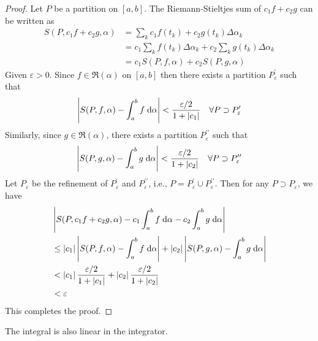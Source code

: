 \documentclass[thmcnt=section, 12pt]{my-elegantbook}
\begin{document}
\begin{proof}
    Let $P$ be a partition on $[a,b]$. The Riemann-Stieltjes sum of $c_1 f + c_2 g$ can be written as 
    \begin{align*}
        S(P, c_1 f + c_2 g, \alpha)
        &= \sum_{k} c_1 f(t_k) + c_2 g(t_k) \Delta\alpha_k \\ 
        &= c_1 \sum_{k} f(t_k) \Delta\alpha_k
        + c_2 \sum_{k} g(t_k) \Delta\alpha_k \\ 
        &= c_1 S(P, f, \alpha) + c_2 S(P, g, \alpha)
    \end{align*}
    Given $\varepsilon > 0$. Since $f \in \mathfrak{R}(\alpha)$ on $[a,b]$ then there exists a partition $P_\varepsilon^{\prime}$
    such that 
    \begin{align*}
        \left\lvert S(P, f, \alpha) - \int_a^b f \; \mathrm{d}\alpha \right\rvert < \frac{\varepsilon / 2}{1 + \left\lvert c_1 \right\rvert}
        \quad \forall P \supset P_\varepsilon^{\prime}
    \end{align*}
    Similarly, since $g \in \mathfrak{R}(\alpha)$, there exists a partition $P_\varepsilon^{\prime\prime}$ such that 
    \begin{align*}
        \left\lvert S(P, g, \alpha) - \int_a^b g \; \mathrm{d}\alpha \right\rvert < \frac{\varepsilon / 2}{1 + \left\lvert c_2 \right\rvert}
        \quad \forall P \supset P_\varepsilon^{\prime\prime}
    \end{align*}
    Let $P_\varepsilon$ be the refinement of $P_\varepsilon^{\prime}$ and $P_\varepsilon^{\prime\prime}$, i.e., $P = P_\varepsilon^{\prime} \cup P_\varepsilon^{\prime\prime}$. Then for any $P \supset P_\varepsilon$, we have 
    \begin{align*}
        &\left\lvert 
            S(P, c_1 f + c_2 g, \alpha) 
            - c_1 \int_a^b f \; \mathrm{d}\alpha
            - c_2 \int_a^b g \; \mathrm{d}\alpha
         \right\rvert \\
        &\leq \left\lvert c_1 \right\rvert \left\lvert S(P,f,\alpha) - \int_a^b f \; \mathrm{d}\alpha \right\rvert
        + \left\lvert c_2 \right\rvert \left\lvert S(P,g,\alpha) - \int_a^b g \; \mathrm{d}\alpha \right\rvert \\ 
        &< \left\lvert c_1 \right\rvert \frac{\varepsilon / 2}{1 + \left\lvert c_1 \right\rvert}
        + \left\lvert c_2 \right\rvert \frac{\varepsilon / 2}{1 + \left\lvert c_2 \right\rvert} \\ 
        &< \varepsilon
    \end{align*}
    This completes the proof.
\end{proof}


\par The integral is also linear in the integrator.
\end{document}
